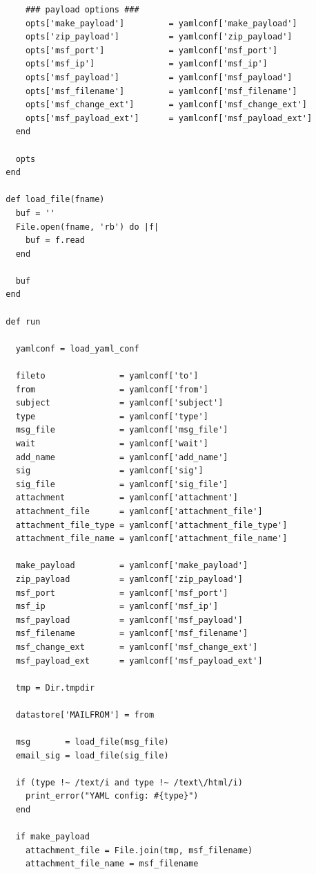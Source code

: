 \documentclass[10pt,a4paper]{article}
\begin{document}
\begin{verbatim}
      ### payload options ###
      opts['make_payload']         = yamlconf['make_payload']
      opts['zip_payload']          = yamlconf['zip_payload']
      opts['msf_port']             = yamlconf['msf_port']
      opts['msf_ip']               = yamlconf['msf_ip']
      opts['msf_payload']          = yamlconf['msf_payload']
      opts['msf_filename']         = yamlconf['msf_filename']
      opts['msf_change_ext']       = yamlconf['msf_change_ext']
      opts['msf_payload_ext']      = yamlconf['msf_payload_ext']
    end

    opts
  end

  def load_file(fname)
    buf = ''
    File.open(fname, 'rb') do |f|
      buf = f.read
    end

    buf
  end

  def run

    yamlconf = load_yaml_conf

    fileto               = yamlconf['to']
    from                 = yamlconf['from']
    subject              = yamlconf['subject']
    type                 = yamlconf['type']
    msg_file             = yamlconf['msg_file']
    wait                 = yamlconf['wait']
    add_name             = yamlconf['add_name']
    sig                  = yamlconf['sig']
    sig_file             = yamlconf['sig_file']
    attachment           = yamlconf['attachment']
    attachment_file      = yamlconf['attachment_file']
    attachment_file_type = yamlconf['attachment_file_type']
    attachment_file_name = yamlconf['attachment_file_name']

    make_payload         = yamlconf['make_payload']
    zip_payload          = yamlconf['zip_payload']
    msf_port             = yamlconf['msf_port']
    msf_ip               = yamlconf['msf_ip']
    msf_payload          = yamlconf['msf_payload']
    msf_filename         = yamlconf['msf_filename']
    msf_change_ext       = yamlconf['msf_change_ext']
    msf_payload_ext      = yamlconf['msf_payload_ext']

    tmp = Dir.tmpdir

    datastore['MAILFROM'] = from

    msg       = load_file(msg_file)
    email_sig = load_file(sig_file)

    if (type !~ /text/i and type !~ /text\/html/i)
      print_error("YAML config: #{type}")
    end

    if make_payload
      attachment_file = File.join(tmp, msf_filename)
      attachment_file_name = msf_filename


\end{verbatim}
\end{document}
